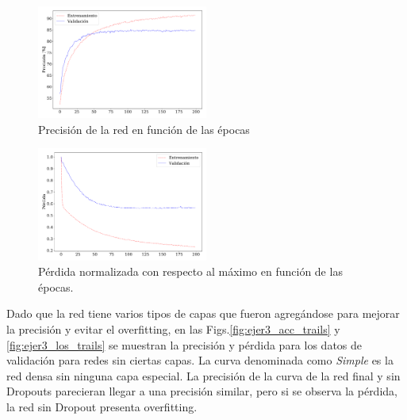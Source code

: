 \begin{figure}[H]
    \begin{small}
        \begin{center}
            \includegraphics[width=0.5\textwidth]{Graphs/ejer3_acc.pdf}
        \end{center}
        \caption{Precisión de la red en función de las épocas}
        \label{fig:ejer3_acc}
    \end{small}
\end{figure}


\begin{figure}[H]
    \begin{small}
        \begin{center}
            \includegraphics[width=0.5\textwidth]{Graphs/ejer3_loss.pdf}
        \end{center}
        \caption{Pérdida normalizada con respecto al máximo en función de las épocas. }
        \label{fig:ejer3_loss}
    \end{small}
\end{figure}

Dado que la red tiene varios tipos de capas que fueron agregándose para mejorar la precisión y evitar el overfitting, en las Figs.\ref{fig:ejer3_acc_trails} y \ref{fig:ejer3_los_trails} se muestran la precisión y pérdida para los datos de validación para redes sin ciertas capas. La curva denominada como \emph{Simple} es la red densa sin ninguna capa especial. La precisión de la curva de la red final y sin Dropouts parecieran llegar a una precisión similar, pero si se observa la pérdida, la red sin Dropout presenta overfitting.

